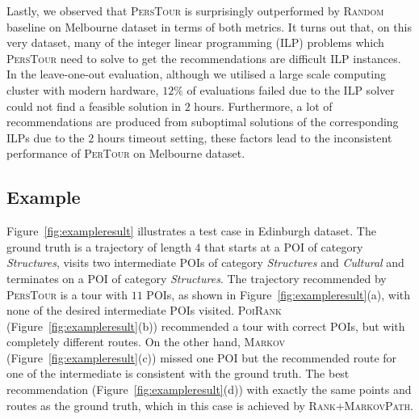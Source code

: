 Lastly, we observed that \textsc{PersTour} is surprisingly outperformed by \textsc{Random} baseline
on Melbourne dataset in terms of both metrics.
It turns out that, on this very dataset, many of the integer linear programming (ILP) problems
which \textsc{PersTour} need to solve to get the recommendations are difficult ILP instances.
In the leave-one-out evaluation, although we utilised a large scale computing cluster with modern hardware,
$12\%$ of evaluations failed due to the ILP solver could not find a feasible solution in $2$ hours.
Furthermore, a lot of recommendations are produced from suboptimal solutions of the corresponding ILPs due to
the $2$ hours timeout setting, these factors lead to the inconsistent performance of \textsc{PerTour} on Melbourne dataset.


\subsection{Example}
\label{sec:example}
\secmoveup

Figure~\ref{fig:exampleresult} illustrates a test case in Edinburgh dataset.
The ground truth is a trajectory of length $4$ that starts at a POI of category \textit{Structures},
visits two intermediate POIs of category \textit{Structures} and \textit{Cultural} and
terminates on a POI of category \textit{Structures}.
The trajectory recommended by \textsc{PersTour} is a tour with $11$ POIs, as shown in Figure~\ref{fig:exampleresult}(a),
with none of the desired intermediate POIs visited.
\textsc{PoiRank} (Figure~\ref{fig:exampleresult}(b)) recommended a tour with correct POIs,
but with completely different routes.
On the other hand, \textsc{Markov} (Figure~\ref{fig:exampleresult}(c)) missed one POI but the recommended route for one of the intermediate is consistent with the ground truth.
The best recommendation%
(Figure~\ref{fig:exampleresult}(d)) 
with exactly the same points and routes as the ground truth,
which in this case is achieved by \textsc{Rank+MarkovPath}.





